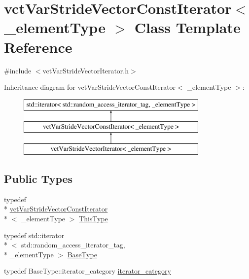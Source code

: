 \hypertarget{classvct_var_stride_vector_const_iterator}{\section{vct\-Var\-Stride\-Vector\-Const\-Iterator$<$ \-\_\-element\-Type $>$ Class Template Reference}
\label{classvct_var_stride_vector_const_iterator}
}


{\ttfamily \#include $<$vct\-Var\-Stride\-Vector\-Iterator.\-h$>$}

Inheritance diagram for vct\-Var\-Stride\-Vector\-Const\-Iterator$<$ \-\_\-element\-Type $>$\-:\begin{figure}[H]
\begin{center}
\leavevmode
\includegraphics[height=3.000000cm]{d4/d94/classvct_var_stride_vector_const_iterator}
\end{center}
\end{figure}
\subsection*{Public Types}
\begin{DoxyCompactItemize}
\item 
typedef \\*
\hyperlink{classvct_var_stride_vector_const_iterator}{vct\-Var\-Stride\-Vector\-Const\-Iterator}\\*
$<$ \-\_\-element\-Type $>$ \hyperlink{classvct_var_stride_vector_const_iterator_afd99aad7dc756d227f4fb02cd569d00a}{This\-Type}
\item 
typedef std\-::iterator\\*
$<$ std\-::random\-\_\-access\-\_\-iterator\-\_\-tag, \\*
\-\_\-element\-Type $>$ \hyperlink{classvct_var_stride_vector_const_iterator_aff6a833a060e9e88031f459ab4380d1e}{Base\-Type}
\item 
typedef Base\-Type\-::iterator\-\_\-category \hyperlink{classvct_var_stride_vector_const_iterator_ab2fdb1f3617d3ac621e096e4a447694a}{iterator\-\_\-category}
\end{DoxyCompactItemize}

